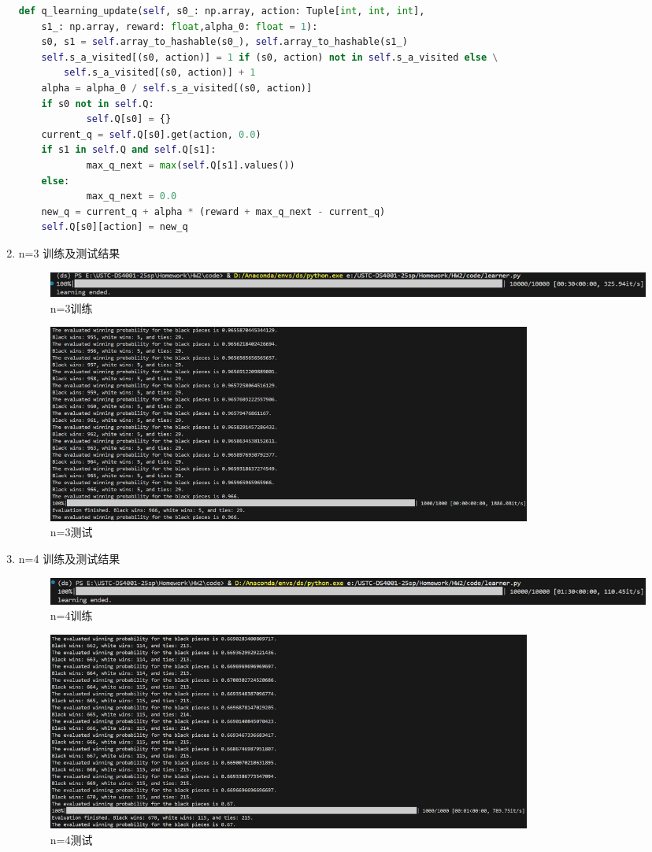 \documentclass{article}
\begin{document}
\begin{enumerate}[label=(\alph*), start=1]
    \begin{lstlisting}[language=Python]
def q_learning_update(self, s0_: np.array, action: Tuple[int, int, int], 
	s1_: np.array, reward: float,alpha_0: float = 1):
    s0, s1 = self.array_to_hashable(s0_), self.array_to_hashable(s1_)
    self.s_a_visited[(s0, action)] = 1 if (s0, action) not in self.s_a_visited else \
        self.s_a_visited[(s0, action)] + 1
    alpha = alpha_0 / self.s_a_visited[(s0, action)]
    if s0 not in self.Q:
    		self.Q[s0] = {}
    current_q = self.Q[s0].get(action, 0.0)
    if s1 in self.Q and self.Q[s1]:
    		max_q_next = max(self.Q[s1].values())
    else:
    		max_q_next = 0.0
    new_q = current_q + alpha * (reward + max_q_next - current_q)
    self.Q[s0][action] = new_q
    \end{lstlisting}

    \item n=3 训练及测试结果
    \FloatBarrier
    \begin{figure}[htbp]
    	\centering
    	\includegraphics[width=\textwidth]{train3.png}
    	\caption{n=3训练}
    \end{figure}
    \begin{figure}[htbp]
    	\centering
    	\includegraphics[width=0.8\textwidth]{test3.png}
    	\caption{n=3测试}
    \end{figure}
\FloatBarrier
    \item n=4 训练及测试结果
    \FloatBarrier
    \begin{figure}[htbp]
    	\centering
    	\includegraphics[width=\textwidth]{train4.png}
    	\caption{n=4训练}
    \end{figure}
    \begin{figure}[htbp]
    	\centering
    	\includegraphics[width=0.8\textwidth]{test4.png}
    	\caption{n=4测试}
    \end{figure}
    \FloatBarrier
\end{enumerate}
\
\end{document}
